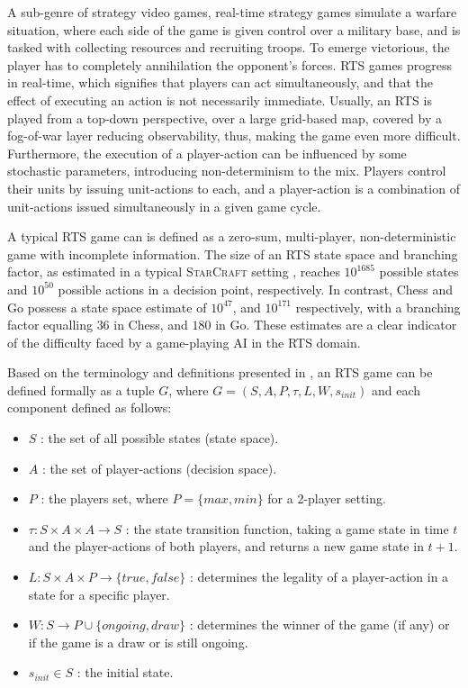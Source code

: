 \documentclass[conference]{IEEEtran}
\begin{document}
A sub-genre of strategy video games, real-time strategy games simulate a warfare situation, where each side of the game is given control over a military base, and is tasked with collecting resources and recruiting troops. To emerge victorious, the player has to completely annihilation the opponent's forces. RTS games progress in real-time, which signifies that players can act simultaneously, and that the effect of executing an action is not necessarily immediate. Usually, an RTS is played from a top-down perspective, over a large grid-based map, covered by a fog-of-war layer reducing observability, thus, making the game even more difficult. Furthermore, the execution of a player-action can be influenced by some stochastic parameters, introducing non-determinism to the mix. Players control their units by issuing unit-actions to each, and a player-action is a combination of unit-actions issued simultaneously in a given game cycle.

A typical RTS game can is defined as a zero-sum, multi-player, non-deterministic game with incomplete information. The size of an RTS state space and branching factor, as estimated in a typical \textsc{StarCraft} setting \cite{ontanon_survey_2013}, reaches $10^{1685}$ possible states and $10^{50}$ possible actions in a decision point, respectively. In contrast, Chess and Go possess a state space estimate of $10^{47}$, and $10^{171}$ respectively, with a branching factor equalling $36$ in Chess, and $180$ in Go. These estimates are a clear indicator of the difficulty faced by a game-playing AI in the RTS domain.

Based on the terminology and definitions presented in \cite{ontanon_combinatorial_2017}, an RTS game can be defined formally as a tuple $G$, where $G = (S, A, P, \tau, L, W, s_{init})$ and each component defined as follows:

\begin{itemize}
\item $S$ : the set of all possible states (state space).
\item $A$ : the set of player-actions (decision space).
\item $P$ : the players set, where $P=\{max,min\}$ for a 2-player setting.
\item $\tau : S \times A \times A \rightarrow S$ : the state transition function, taking a game state in time $t$ and the player-actions of both players, and returns a new game state in $t+1$.
\item $L: S \times A \times P \rightarrow \{true,false\}$ : determines the legality of a player-action in a state for a specific player.
\item $W: S \rightarrow P \cup \{ongoing,draw\}$ : determines the winner of the game (if any) or if the game is a draw or is still ongoing.
\item $s_{init} \in S$ : the initial state.
\end{itemize}
\end{document}
